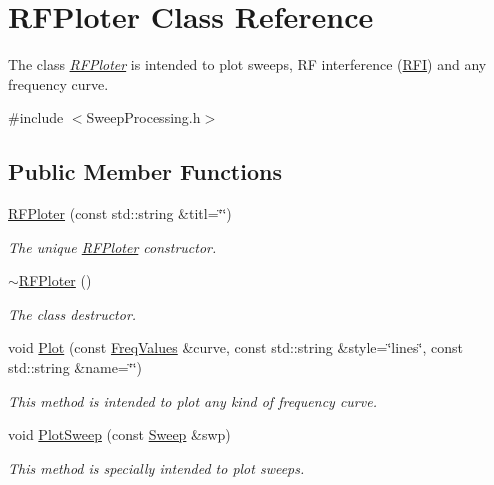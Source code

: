 \hypertarget{classRFPloter}{}\section{R\+F\+Ploter Class Reference}
\label{classRFPloter}


The class {\itshape \hyperlink{classRFPloter}{R\+F\+Ploter}} is intended to plot sweeps, RF interference (\hyperlink{structRFI}{R\+FI}) and any frequency curve.  




{\ttfamily \#include $<$Sweep\+Processing.\+h$>$}

\subsection*{Public Member Functions}
\begin{DoxyCompactItemize}
\item 
\hyperlink{classRFPloter_ab7b36c6de3e288b7ab88238b16a0816a}{R\+F\+Ploter} (const std\+::string \&titl=\char`\"{}\char`\"{})
\begin{DoxyCompactList}\small\item\em The unique {\itshape \hyperlink{classRFPloter}{R\+F\+Ploter}} constructor. \end{DoxyCompactList}\item 
\hyperlink{classRFPloter_a773b630723c5fbd6f05173a52de7f35e}{$\sim$\+R\+F\+Ploter} ()
\begin{DoxyCompactList}\small\item\em The class destructor. \end{DoxyCompactList}\item 
void \hyperlink{classRFPloter_a8a1c40470c52e8e4522dd0a350ea1aca}{Plot} (const \hyperlink{structFreqValues}{Freq\+Values} \&curve, const std\+::string \&style=\char`\"{}lines\char`\"{}, const std\+::string \&name=\char`\"{}\char`\"{})
\begin{DoxyCompactList}\small\item\em This method is intended to plot any kind of frequency curve. \end{DoxyCompactList}\item 
void \hyperlink{classRFPloter_a931802544a2126713a078dcfc4971618}{Plot\+Sweep} (const \hyperlink{structSweep}{Sweep} \&swp)
\begin{DoxyCompactList}\small\item\em This method is specially intended to plot sweeps. \end{DoxyCompactList}\item 

\end{DoxyCompactItemize}
